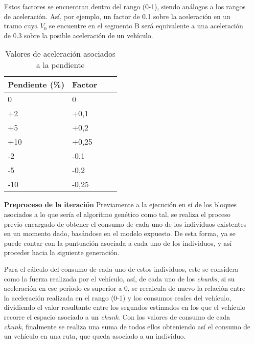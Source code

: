 \documentclass[11pt,spanish,listoffigures,listoftables]{tfgetsinf}
\begin{document}
\begin{itemize}
    Estos factores se encuentran dentro del rango (0-1), siendo análogos a los rangos de aceleración. Así, por ejemplo, un factor de 0.1 sobre la aceleración en un tramo cuya $V_{0}$ se encuentre en el segmento B será equivalente a una aceleración de 0.3 sobre la posible aceleración de un vehículo.
    
    \begin{table}[h]
    \centering
    \begin{tabular}{|l|l|l|l|}
    \hline
    \textbf{Pendiente (\%)} & \textbf{Factor} \\ \hline
    0       &   0       \\ \hline
    +2      &   +0,1    \\ \hline
    +5      &   +0,2    \\ \hline
    +10     &   +0,25   \\ \hline
    -2      &   -0,1    \\ \hline
    -5      &   -0,2    \\ \hline
    -10     &   -0,25   \\ \hline
    \end{tabular}
    \caption{Valores de aceleración asociados a la pendiente}
    \label{tab:v1_slope_accel}
    \end{table}
\end{itemize}

\textbf{Preproceso de la iteración}\newline
Previamente a la ejecución en sí de los bloques asociados a lo que sería el algoritmo genético como tal, se realiza el proceso previo encargado de obtener el consumo de cada uno de los individuos existentes en un momento dado, basándose en el modelo expuesto. De esta forma, ya se puede contar con la puntuación asociada a cada uno de los individuos, y así proceder hacia la siguiente generación.

Para el cálculo del consumo de cada uno de estos individuos, este se considera como la fuerza realizada por el vehículo, así, de cada uno de los \textit{chunks}, si su aceleración en ese periodo es superior a 0, se recalcula de nuevo la relación entre la aceleración realizada en el rango (0-1) y los consumos reales del vehículo, dividiendo el valor resultante entre los segundos estimados en los que el vehículo recorre el espacio asociado a un \textit{chunk}. Con los valores de consumo de cada \textit{chunk}, finalmente se realiza una suma de todos ellos obteniendo así el consumo de un vehículo en una ruta, que queda asociado a un individuo.
\end{document}
